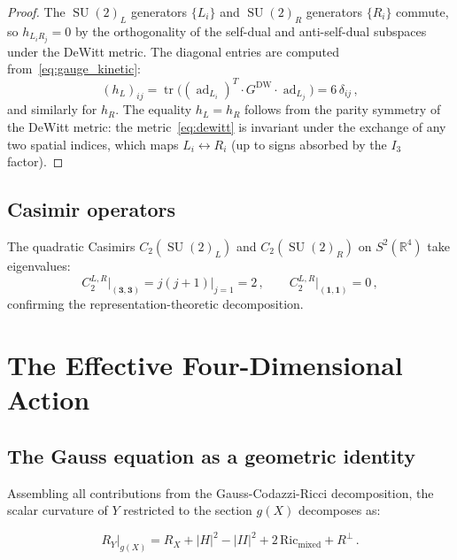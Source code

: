 \documentclass[12pt,a4paper]{article}
\theoremstyle{definition}
\newcommand{\tr}{\operatorname{tr}}
\newcommand{\SU}{\operatorname{SU}}
\newcommand{\ad}{\operatorname{ad}}
\newcommand{\R}{\mathbb{R}}
\begin{document}
\begin{proof}
The $\SU(2)_L$ generators $\{L_i\}$ and $\SU(2)_R$ generators $\{R_i\}$ commute, so $h_{L_i R_j} = 0$ by the orthogonality of the self-dual and anti-self-dual subspaces under the DeWitt metric.
The diagonal entries are computed from~\eqref{eq:gauge_kinetic}:
\begin{equation}
(h_L)_{ij} = \tr\!\big((\ad_{L_i})^T\! \cdot G^{\mathrm{DW}} \cdot \ad_{L_j}\big) = 6\,\delta_{ij}\,,
\end{equation}
and similarly for $h_R$.
The equality $h_L = h_R$ follows from the parity symmetry of the DeWitt metric: the metric~\eqref{eq:dewitt} is invariant under the exchange of any two spatial indices, which maps $L_i \leftrightarrow R_i$ (up to signs absorbed by the $I_3$ factor).
\end{proof}

\subsection{Casimir operators}

The quadratic Casimirs $C_2(\SU(2)_L)$ and $C_2(\SU(2)_R)$ on $S^2(\R^4)$ take eigenvalues:
\begin{equation}
C_2^{L,R}\big|_{(\mathbf{3},\mathbf{3})} = j(j+1)\big|_{j=1} = 2\,,\qquad
C_2^{L,R}\big|_{(\mathbf{1},\mathbf{1})} = 0\,,
\end{equation}
confirming the representation-theoretic decomposition.


\section{The Effective Four-Dimensional Action}
\label{sec:action}

\subsection{The Gauss equation as a geometric identity}

Assembling all contributions from the Gauss-Codazzi-Ricci decomposition, the scalar curvature of $Y$ restricted to the section $g(X)$ decomposes as:

\begin{equation}
\label{eq:full_decomp}
R_Y\big|_{g(X)} = R_X + |H|^2 - |II|^2 + 2\,\mathrm{Ric}_{\mathrm{mixed}} + R^\perp\,.
\end{equation}
\end{document}
